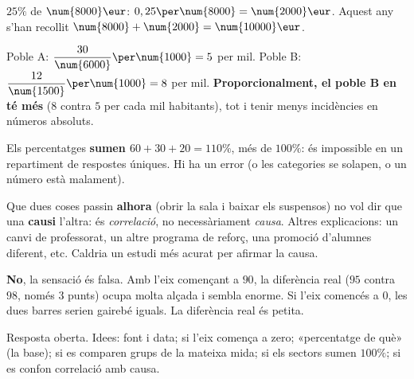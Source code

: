 \begin{solucions}
\begin{sollist}
  \item $25\%$ de $\num{8000}\eur$: $0,25\per\num{8000}=\num{2000}\eur$. Aquest any
        s'han recollit $\num{8000}+\num{2000}=\num{10000}\eur$.
  \item Poble A: $\dfrac{30}{\num{6000}}\per\num{1000}=5$ per mil. Poble B:
        $\dfrac{12}{\num{1500}}\per\num{1000}=8$ per mil. \textbf{Proporcionalment, el
        poble B en té més} ($8$ contra $5$ per cada mil habitants), tot i tenir menys
        incidències en números absoluts.
  \item Els percentatges \textbf{sumen $60+30+20=110\%$}, més de $100\%$: és
        impossible en un repartiment de respostes úniques. Hi ha un error (o les
        categories se solapen, o un número està malament).
  \item Que dues coses passin \textbf{alhora} (obrir la sala i baixar els suspensos) no
        vol dir que una \textbf{causi} l'altra: és \emph{correlació}, no
        necessàriament \emph{causa}. Altres explicacions: un canvi de professorat, un
        altre programa de reforç, una promoció d'alumnes diferent, etc. Caldria un
        estudi més acurat per afirmar la causa.
  \item \textbf{No}, la sensació és falsa. Amb l'eix començant a $90$, la diferència
        real ($95$ contra $98$, només $3$ punts) ocupa molta alçada i sembla enorme. Si
        l'eix comencés a $0$, les dues barres serien gairebé iguals. La diferència real
        és petita.
  \item Resposta oberta. Idees: font i data; si l'eix comença a zero; «percentatge de
        què» (la base); si es comparen grups de la mateixa mida; si els sectors sumen
        $100\%$; si es confon correlació amb causa.
\end{sollist}
\end{solucions}
